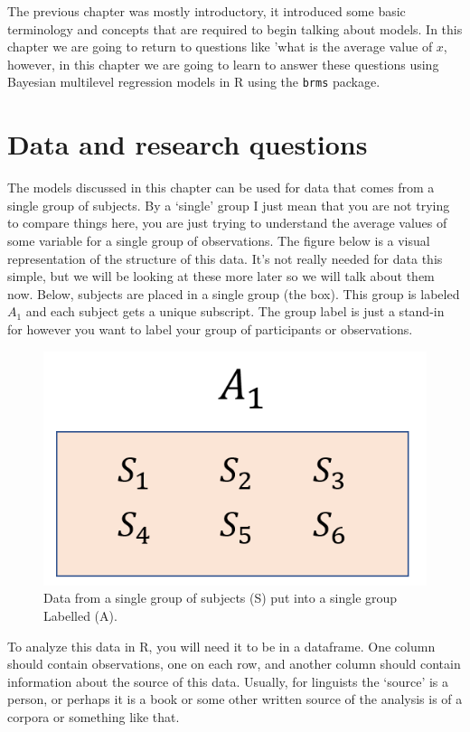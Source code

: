\documentclass[
]{book}
\begin{document}
The previous chapter was mostly introductory, it introduced some basic terminology and concepts that are required to begin talking about models. In this chapter we are going to return to questions like 'what is the average value of \(x\), however, in this chapter we are going to learn to answer these questions using Bayesian multilevel regression models in R using the \texttt{brms} package.

\hypertarget{data-and-research-questions-1}{%
\section{Data and research questions}\label{data-and-research-questions-1}}

The models discussed in this chapter can be used for data that comes from a single group of subjects. By a `single' group I just mean that you are not trying to compare things here, you are just trying to understand the average values of some variable for a single group of observations. The figure below is a visual representation of the structure of this data. It's not really needed for data this simple, but we will be looking at these more later so we will talk about them now. Below, subjects are placed in a single group (the box). This group is labeled \(A_1\) and each subject gets a unique subscript. The group label is just a stand-in for however you want to label your group of participants or observations.

\begin{figure}

{\centering \includegraphics[width=0.5\linewidth]{./images/design_ch2} 

}

\caption{Data from a single group of subjects (S) put into a single group Labelled (A).}\label{fig:F2-interactionfig}
\end{figure}

To analyze this data in R, you will need it to be in a dataframe. One column should contain observations, one on each row, and another column should contain information about the source of this data. Usually, for linguists the `source' is a person, or perhaps it is a book or some other written source of the analysis is of a corpora or something like that.
\end{document}
